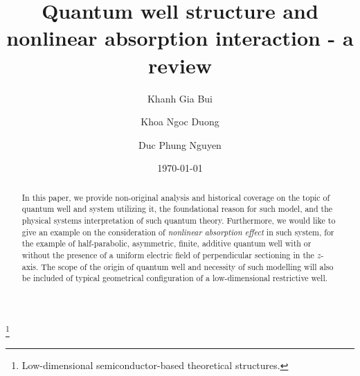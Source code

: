 \documentclass[%
 reprint,
 amsmath,amssymb,
 aps,
]{revtex4-2}
\begin{document}

\title{Quantum well structure and nonlinear absorption interaction - a review}%
\thanks{Low-dimensional semiconductor-based theoretical structures.}%

\author{Khanh Gia Bui}
\author{Khoa Ngoc Duong}%
\author{Duc Phung Nguyen}
%


% 


\date{\today}%

\begin{abstract}
In this paper, we provide non-original analysis and historical coverage on the topic of quantum well and system utilizing it, the foundational reason for such model, and the physical systems interpretation of such quantum theory. Furthermore, we would like to give an example on the consideration of \textit{nonlinear absorption effect} in such system, for the example of half-parabolic, asymmetric, finite, additive quantum well with or without the presence of a uniform electric field of perpendicular sectioning in the $z$-axis. The scope of the origin of quantum well and necessity of such modelling will also be included of typical geometrical configuration of a low-dimensional restrictive well.  
\end{abstract}

\maketitle
\end{document}
